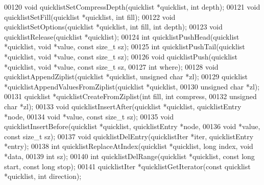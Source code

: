 \begin{DoxyCode}
00120 \textcolor{keywordtype}{void} quicklistSetCompressDepth(quicklist *quicklist, \textcolor{keywordtype}{int} depth);
00121 \textcolor{keywordtype}{void} quicklistSetFill(quicklist *quicklist, \textcolor{keywordtype}{int} fill);
00122 \textcolor{keywordtype}{void} quicklistSetOptions(quicklist *quicklist, \textcolor{keywordtype}{int} fill, \textcolor{keywordtype}{int} depth);
00123 \textcolor{keywordtype}{void} quicklistRelease(quicklist *quicklist);
00124 \textcolor{keywordtype}{int} quicklistPushHead(quicklist *quicklist, \textcolor{keywordtype}{void} *value, \textcolor{keyword}{const} size\_t sz);
00125 \textcolor{keywordtype}{int} quicklistPushTail(quicklist *quicklist, \textcolor{keywordtype}{void} *value, \textcolor{keyword}{const} size\_t sz);
00126 \textcolor{keywordtype}{void} quicklistPush(quicklist *quicklist, \textcolor{keywordtype}{void} *value, \textcolor{keyword}{const} size\_t sz,
00127                    \textcolor{keywordtype}{int} where);
00128 \textcolor{keywordtype}{void} quicklistAppendZiplist(quicklist *quicklist, \textcolor{keywordtype}{unsigned} \textcolor{keywordtype}{char} *zl);
00129 quicklist *quicklistAppendValuesFromZiplist(quicklist *quicklist,
00130                                             \textcolor{keywordtype}{unsigned} \textcolor{keywordtype}{char} *zl);
00131 quicklist *quicklistCreateFromZiplist(\textcolor{keywordtype}{int} fill, \textcolor{keywordtype}{int} compress,
00132                                       \textcolor{keywordtype}{unsigned} \textcolor{keywordtype}{char} *zl);
00133 \textcolor{keywordtype}{void} quicklistInsertAfter(quicklist *quicklist, quicklistEntry *node,
00134                           \textcolor{keywordtype}{void} *value, \textcolor{keyword}{const} size\_t sz);
00135 \textcolor{keywordtype}{void} quicklistInsertBefore(quicklist *quicklist, quicklistEntry *node,
00136                            \textcolor{keywordtype}{void} *value, \textcolor{keyword}{const} size\_t sz);
00137 \textcolor{keywordtype}{void} quicklistDelEntry(quicklistIter *iter, quicklistEntry *entry);
00138 \textcolor{keywordtype}{int} quicklistReplaceAtIndex(quicklist *quicklist, \textcolor{keywordtype}{long} index, \textcolor{keywordtype}{void} *data,
00139                             \textcolor{keywordtype}{int} sz);
00140 \textcolor{keywordtype}{int} quicklistDelRange(quicklist *quicklist, \textcolor{keyword}{const} \textcolor{keywordtype}{long} start, \textcolor{keyword}{const} \textcolor{keywordtype}{long} stop);
00141 quicklistIter *quicklistGetIterator(\textcolor{keyword}{const} quicklist *quicklist, \textcolor{keywordtype}{int} direction);

\end{DoxyCode}

